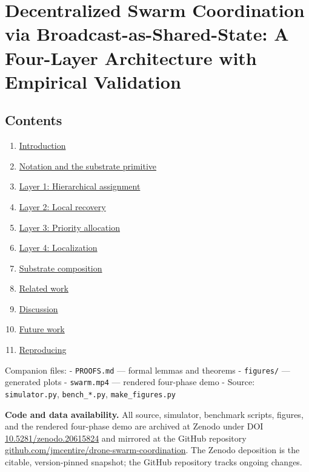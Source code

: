 \section{Decentralized Swarm Coordination via Broadcast-as-Shared-State:
A Four-Layer Architecture with Empirical
Validation}\label{decentralized-swarm-coordination-via-broadcast-as-shared-state-a-four-layer-architecture-with-empirical-validation}

\subsection{Contents}\label{contents}

\begin{enumerate}
\def\labelenumi{\arabic{enumi}.}
\tightlist
\item
  \hyperref[1-introduction]{Introduction}
\item
  \hyperref[2-notation-and-the-substrate-primitive]{Notation and the
  substrate primitive}
\item
  \hyperref[3-layer-1-hierarchical-assignment]{Layer 1: Hierarchical
  assignment}
\item
  \hyperref[4-layer-2-local-recovery]{Layer 2: Local recovery}
\item
  \hyperref[5-layer-3-priority-allocation]{Layer 3: Priority allocation}
\item
  \hyperref[6-layer-4-localization]{Layer 4: Localization}
\item
  \hyperref[7-substrate-composition]{Substrate composition}
\item
  \hyperref[8-related-work]{Related work}
\item
  \hyperref[9-discussion]{Discussion}
\item
  \hyperref[10-future-work]{Future work}
\item
  \hyperref[11-reproducing]{Reproducing}
\end{enumerate}

Companion files: - \texttt{PROOFS.md} --- formal lemmas and theorems -
\texttt{figures/} --- generated plots - \texttt{swarm.mp4} --- rendered
four-phase demo - Source: \texttt{simulator.py}, \texttt{bench\_*.py},
\texttt{make\_figures.py}

\textbf{Code and data availability.} All source, simulator, benchmark
scripts, figures, and the rendered four-phase demo are archived at
Zenodo under DOI
\href{https://doi.org/10.5281/zenodo.20615824}{10.5281/zenodo.20615824}
and mirrored at the GitHub repository
\href{https://github.com/jmcentire/drone-swarm-coordination}{github.com/jmcentire/drone-swarm-coordination}.
The Zenodo deposition is the citable, version-pinned snapshot; the
GitHub repository tracks ongoing changes.

